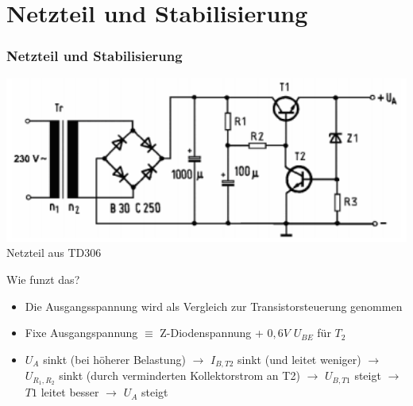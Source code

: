 \section*{Netzteil und Stabilisierung}
\begin{frame}
  \frametitle{Netzteil und Stabilisierung}
  \begin{center}
    \includegraphics[width=1\textwidth,height=.43\textheight,keepaspectratio]{a17/TD306.png}
    {\tiny Netzteil aus TD306 \hyperlink{refs}{\cite{bna}}}
  \end{center}
  Wie funzt das?
  \begin{itemize}
    \item Die Ausgangsspannung wird als Vergleich zur Transistorsteuerung genommen
    \item Fixe Ausgangspannung $\equiv$ Z-Diodenspannung + $0,6V$ $U_{BE}$ für $T_2$
    \item $U_A$ sinkt (bei höherer Belastung) $\rightarrow$ $I_{B,T2}$ sinkt (und leitet weniger) $\rightarrow$ $U_{R_1,R_2}$ sinkt (durch verminderten Kollektorstrom an T2) $\rightarrow$ $U_{B,T1}$ steigt $\rightarrow$ $T1$ leitet besser $\rightarrow$ $U_A$ steigt
  \end{itemize}
\end{frame}

